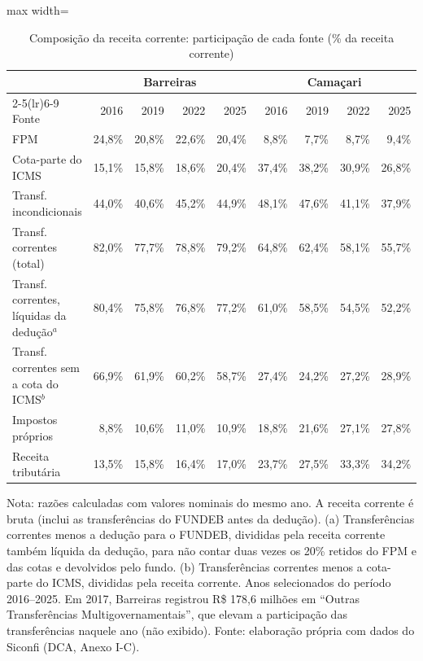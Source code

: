 \begin{table}[H]
\centering\footnotesize
\setlength{\tabcolsep}{4pt}
\caption{Composição da receita corrente: participação de cada fonte (\% da receita corrente)}
\label{tab:composicao}
\begin{adjustbox}{max width=\textwidth}
\begin{tabular}{lrrrrrrrr}
\toprule
 & \multicolumn{4}{c}{Barreiras} & \multicolumn{4}{c}{Camaçari} \\
\cmidrule(lr){2-5}\cmidrule(lr){6-9}
Fonte & 2016 & 2019 & 2022 & 2025 & 2016 & 2019 & 2022 & 2025 \\
\midrule
FPM & 24,8\% & 20,8\% & 22,6\% & 20,4\% & 8,8\% & 7,7\% & 8,7\% & 9,4\% \\
Cota-parte do ICMS & 15,1\% & 15,8\% & 18,6\% & 20,4\% & 37,4\% & 38,2\% & 30,9\% & 26,8\% \\
Transf. incondicionais & 44,0\% & 40,6\% & 45,2\% & 44,9\% & 48,1\% & 47,6\% & 41,1\% & 37,9\% \\
Transf. correntes (total) & 82,0\% & 77,7\% & 78,8\% & 79,2\% & 64,8\% & 62,4\% & 58,1\% & 55,7\% \\
Transf. correntes, líquidas da dedução$^{a}$ & 80,4\% & 75,8\% & 76,8\% & 77,2\% & 61,0\% & 58,5\% & 54,5\% & 52,2\% \\
Transf. correntes sem a cota do ICMS$^{b}$ & 66,9\% & 61,9\% & 60,2\% & 58,7\% & 27,4\% & 24,2\% & 27,2\% & 28,9\% \\
Impostos próprios & 8,8\% & 10,6\% & 11,0\% & 10,9\% & 18,8\% & 21,6\% & 27,1\% & 27,8\% \\
Receita tributária & 13,5\% & 15,8\% & 16,4\% & 17,0\% & 23,7\% & 27,5\% & 33,3\% & 34,2\% \\
\bottomrule
\end{tabular}
\end{adjustbox}
\par\vspace{3pt}\parbox{\textwidth}{\scriptsize Nota: razões calculadas com valores nominais do mesmo ano. A receita corrente é bruta (inclui as transferências do FUNDEB antes da dedução). (a) Transferências correntes menos a dedução para o FUNDEB, divididas pela receita corrente também líquida da dedução, para não contar duas vezes os 20\% retidos do FPM e das cotas e devolvidos pelo fundo. (b) Transferências correntes menos a cota-parte do ICMS, divididas pela receita corrente. Anos selecionados do período 2016--2025. Em 2017, Barreiras registrou R\$ 178,6 milhões em ``Outras Transferências Multigovernamentais'', que elevam a participação das transferências naquele ano (não exibido). Fonte: elaboração própria com dados do Siconfi (DCA, Anexo I-C).}
\end{table}
